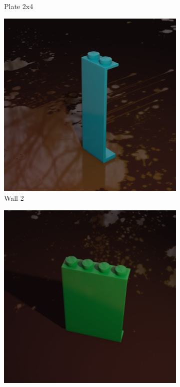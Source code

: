 \documentclass[]{article}
\begin{document}
\begin{figure}[h]
\begin{subfigure}[b]{0.15\textwidth}
        \caption{Plate 2x4}
    \end{subfigure}
    \begin{subfigure}[b]{0.15\textwidth}
        \centering
        \includegraphics[width=\textwidth]{Examples/wall-2.jpg}
        \caption{Wall 2}
    \end{subfigure}
    \begin{subfigure}[b]{0.15\textwidth}
        \centering
        \includegraphics[width=\textwidth]{Examples/wall-4.jpg}

\end{subfigure}
\end{figure}
\end{document}
